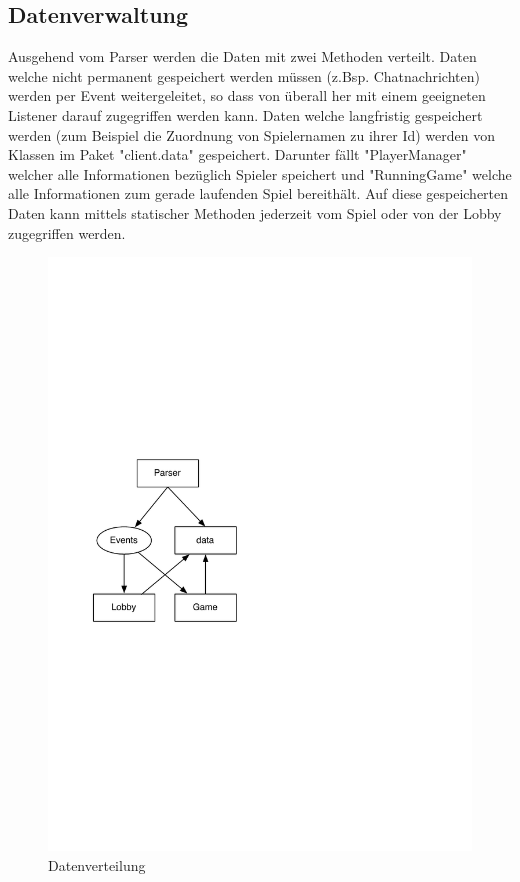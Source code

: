 \documentclass[ngerman, 12pt, pdftex]{scrartcl}[2006/07/30]
\begin{document}
\subsection{Datenverwaltung}
Ausgehend vom Parser werden die Daten mit zwei Methoden verteilt.
Daten welche nicht permanent gespeichert werden müssen (z.Bsp. Chatnachrichten) werden per Event 
weitergeleitet, so dass von überall her mit einem geeigneten Listener darauf zugegriffen werden kann.
Daten welche langfristig gespeichert werden (zum Beispiel die Zuordnung von Spielernamen zu ihrer Id) werden
von Klassen im Paket "client.data" gespeichert. Darunter fällt  "PlayerManager" welcher alle Informationen bezüglich Spieler speichert und "RunningGame" welche alle Informationen zum gerade laufenden Spiel bereithält.
Auf diese gespeicherten Daten kann mittels statischer Methoden jederzeit vom Spiel oder von der Lobby zugegriffen werden.

\begin{figure}[h!]
\centering
\includegraphics[scale=0.6]{client/datenhaltung.pdf}
\caption{Datenverteilung}
\end{figure}
\end{document}
